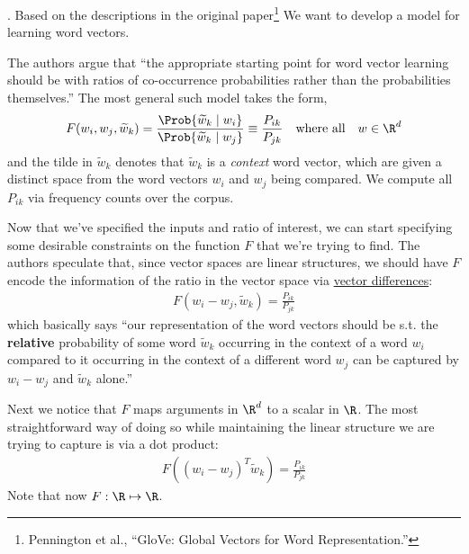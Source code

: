 \documentclass[11pt]{article}
\newcommand\myspace[1][]{\vspace{#1\bigskipamount}}
\newcommand\p{\Needspace{10\baselineskip} \noindent}
\begin{document}
\myspace
\p {}. Based on the descriptions in the original paper\footnote{Pennington et al., ``GloVe: Global Vectors for Word Representation.''} We want to develop a model for learning word vectors. 

\begin{compactenum}
	\item The authors argue that ``the appropriate starting point for word vector learning should be with ratios of co-occurrence probabilities rather than the probabilities themselves.'' The most general such model takes the form,
	\begin{align}
	F(w_i, w_j, \widetilde w_k) = \frac{\Prob{\widetilde w_k \mid w_i}}{\Prob{\widetilde w_k \mid w_j}} \equiv \frac{P_{ik}}{P_{jk}} \quad \text{where all} \quad w \in \R^d
	\end{align}
	and the tilde in $\widetilde w_k$ denotes that $\widetilde w_k$ is a \textit{context} word vector, which are given a distinct space from the word vectors $w_i$ and $w_j$ being compared. We compute all $P_{ik}$ via frequency counts over the corpus. 
	
	\item Now that we've specified the inputs and ratio of interest, we can start specifying some desirable constraints on the function $F$ that we're trying to find. The authors speculate that, since vector spaces are linear structures, we should have $F$ encode the information of the ratio in the vector space via \underline{vector differences}:
	\begin{align}
		F(w_i - w_j, \widetilde w_k) = \frac{P_{ik}}{P_{jk}}
	\end{align}
	which basically says ``our representation of the word vectors should be s.t. the \textbf{relative} probability of some word $\widetilde w_k$ occurring in the context of a word $w_i$ compared to it occurring in the context of a different word $w_j$ can be captured by $w_i-w_j$ and $\widetilde w_k$ alone.''
	
	\item Next we notice that $F$ maps arguments in $\R^d$ to a scalar in $\R$. The most straightforward way of doing so while maintaining the linear structure we are trying to capture is via a dot product:
	\begin{align}
		F( (w_i - w_j)^T \widetilde w_k) = \frac{P_{ik}}{P_{jk}} \label{glove-1}
	\end{align}
	Note that now $F: \R \mapsto \R$.
	

\end{compactenum}
\end{document}
